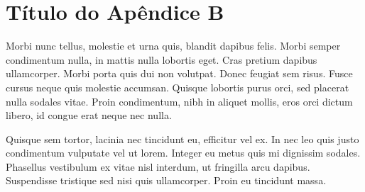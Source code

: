 \chapter{Título do Apêndice B}

Morbi nunc tellus, molestie et urna quis, blandit dapibus felis. Morbi semper condimentum nulla, in mattis nulla lobortis eget. Cras pretium dapibus ullamcorper. Morbi porta quis dui non volutpat. Donec feugiat sem risus. Fusce cursus neque quis molestie accumsan. Quisque lobortis purus orci, sed placerat nulla sodales vitae. Proin condimentum, nibh in aliquet mollis, eros orci dictum libero, id congue erat neque nec nulla.

Quisque sem tortor, lacinia nec tincidunt eu, efficitur vel ex. In nec leo quis justo condimentum vulputate vel ut lorem. Integer eu metus quis mi dignissim sodales. Phasellus vestibulum ex vitae nisl interdum, ut fringilla arcu dapibus. Suspendisse tristique sed nisi quis ullamcorper. Proin eu tincidunt massa.
